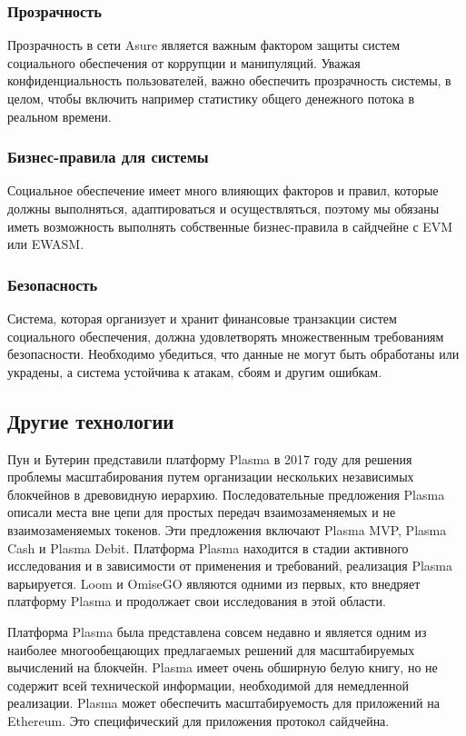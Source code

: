 \subsubsection*{Прозрачность}
Прозрачность в сети Asure является важным фактором защиты систем социального обеспечения от коррупции и манипуляций. Уважая конфиденциальность пользователей, важно обеспечить прозрачность системы, в целом, чтобы включить например статистику общего денежного потока в реальном времени.

\subsubsection*{Бизнес-правила для системы}
Социальное обеспечение имеет много влияющих факторов и правил, которые должны выполняться, адаптироваться и осуществляться, поэтому мы обязаны иметь возможность выполнять собственные бизнес-правила в сайдчейне с EVM или EWASM.

\subsubsection*{Безопасность}
Система, которая организует и хранит финансовые транзакции систем социального обеспечения, должна удовлетворять множественным требованиям безопасности. Необходимо убедиться, что данные не могут быть обработаны или украдены, а система устойчива к атакам, сбоям и другим ошибкам.

\subsection{Другие технологии}
Пун и Бутерин представили платформу Plasma в 2017 году для решения проблемы масштабирования путем организации нескольких независимых блокчейнов в древовидную иерархию. Последовательные предложения Plasma описали места вне цепи для простых передач взаимозаменяемых и не взаимозаменяемых токенов. Эти предложения включают Plasma MVP, Plasma Cash и Plasma Debit. Платформа Plasma находится в стадии активного исследования и в зависимости от применения и требований, реализация Plasma варьируется.\cite{plasma} Loom и OmiseGO являются одними из первых, кто внедряет платформу Plasma и продолжает свои исследования в этой области. 

Платформа Plasma была представлена совсем недавно и является одним из наиболее многообещающих предлагаемых решений для масштабируемых вычислений на блокчейн. Plasma имеет очень обширную белую книгу, но не содержит всей технической информации, необходимой для немедленной реализации. Plasma может обеспечить масштабируемость для приложений на Ethereum. Это специфический для приложения протокол сайдчейна.

